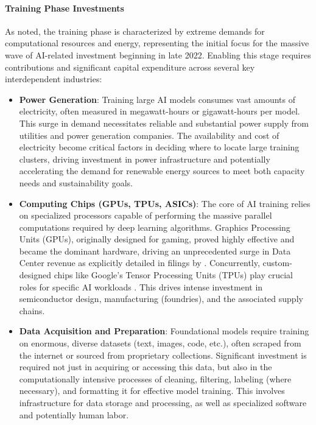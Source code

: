 \paragraph{Training Phase Investments}
As noted, the training phase is characterized by extreme demands for computational resources and energy, representing the initial focus for the massive wave of AI-related investment beginning in late 2022. Enabling this stage requires contributions and significant capital expenditure across several key interdependent industries:
\begin{itemize}
    \item \textbf{Power Generation}: Training large AI models consumes vast amounts of electricity, often measured in megawatt-hours or gigawatt-hours per model. This surge in demand necessitates reliable and substantial power supply from utilities and power generation companies. The availability and cost of electricity become critical factors in deciding where to locate large training clusters, driving investment in power infrastructure and potentially accelerating the demand for renewable energy sources to meet both capacity needs and sustainability goals.
    \item \textbf{Computing Chips (GPUs, TPUs, ASICs)}: The core of AI training relies on specialized processors capable of performing the massive parallel computations required by deep learning algorithms. Graphics Processing Units (GPUs), originally designed for gaming, proved highly effective and became the dominant hardware, driving an unprecedented surge in Data Center revenue as explicitly detailed in filings by \textcite{nvidia202410k}. Concurrently, custom-designed chips like Google's Tensor Processing Units (TPUs) play crucial roles for specific AI workloads \parencite{alphabet202410k}. This drives intense investment in semiconductor design, manufacturing (foundries), and the associated supply chains.
    \item \textbf{Data Acquisition and Preparation}: Foundational models require training on enormous, diverse datasets (text, images, code, etc.), often scraped from the internet or sourced from proprietary collections. Significant investment is required not just in acquiring or accessing this data, but also in the computationally intensive processes of cleaning, filtering, labeling (where necessary), and formatting it for effective model training. This involves infrastructure for data storage and processing, as well as specialized software and potentially human labor.

\end{itemize}
